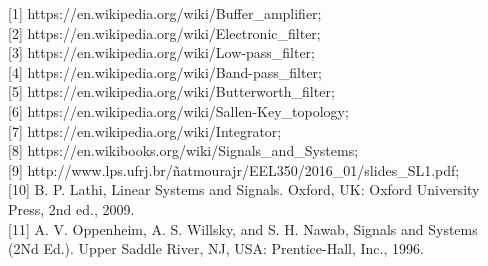 \documentclass[a4paper, 12pt]{article}
\begin{document}
	[1] https://en.wikipedia.org/wiki/Buffer\_amplifier; \\
	
	[2] https://en.wikipedia.org/wiki/Electronic\_filter;\\
	
	[3] https://en.wikipedia.org/wiki/Low-pass\_filter;\\
	
	[4] https://en.wikipedia.org/wiki/Band-pass\_filter;\\
	
	[5] https://en.wikipedia.org/wiki/Butterworth\_filter;\\
	
	[6] https://en.wikipedia.org/wiki/Sallen-Key\_topology;\\
	
	[7] https://en.wikipedia.org/wiki/Integrator;\\
	
	[8] https://en.wikibooks.org/wiki/Signals\_and\_Systems;\\	
	
	[9] http://www.lps.ufrj.br/\~natmourajr/EEL350/2016\_01/slides\_SL1.pdf; \\
	
	[10] B. P. Lathi, Linear Systems and Signals. Oxford, UK: Oxford University Press, 2nd ed., 2009. \\
	
	[11] A. V. Oppenheim, A. S. Willsky, and S. H. Nawab, Signals and Systems (2Nd Ed.). Upper Saddle River, NJ, USA: Prentice-Hall, Inc., 1996.
	
\end{document}
